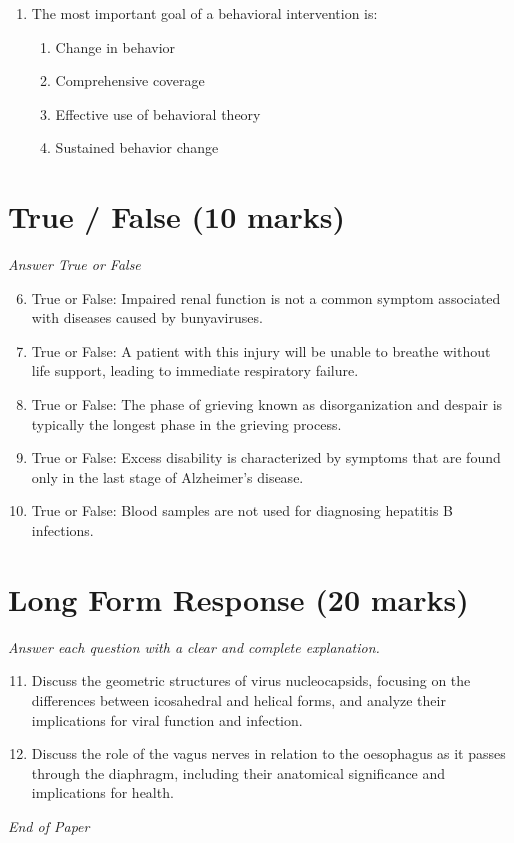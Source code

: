 \documentclass[12pt]{article}
\begin{document}
\begin{enumerate}[label=\arabic*.]
\begin{enumerate}[label=(\alph*)]
    \item Vaccine has been developed
    \item A range of new antivirals
    \item Social distancing
\end{enumerate}
\item The most important goal of a behavioral intervention is:
\begin{enumerate}[label=(\alph*)]
    \item Change in behavior
    \item Comprehensive coverage
    \item Effective use of behavioral theory
    \item Sustained behavior change
\end{enumerate}
\end{enumerate}

\section*{True / False (10 marks)}
\textit{Answer True or False}
\begin{enumerate}[label=\arabic*.]
\setcounter{enumi}{5}
\item True or False: Impaired renal function is not a common symptom associated with diseases caused by bunyaviruses.
\item True or False: A patient with this injury will be unable to breathe without life support, leading to immediate respiratory failure.
\item True or False: The phase of grieving known as disorganization and despair is typically the longest phase in the grieving process.
\item True or False: Excess disability is characterized by symptoms that are found only in the last stage of Alzheimer's disease.
\item True or False: Blood samples are not used for diagnosing hepatitis B infections.
\end{enumerate}

\section*{Long Form Response (20 marks)}
\textit{Answer each question with a clear and complete explanation.}
\begin{enumerate}[label=\arabic*.]
\setcounter{enumi}{10}
\item Discuss the geometric structures of virus nucleocapsids, focusing on the differences between icosahedral and helical forms, and analyze their implications for viral function and infection.
\item Discuss the role of the vagus nerves in relation to the oesophagus as it passes through the diaphragm, including their anatomical significance and implications for health.
\end{enumerate}

\vfill
\noindent\textit{End of Paper}
\end{document}
